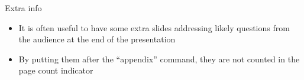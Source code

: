 \documentclass[
  xcolor={hyperref,svgnames,x11names,table},
  hyperref={pdfencoding=unicode,plainpages=false,pdfpagelabels=true,breaklinks=true},
  brazilian,english,12pt,aspectratio=149,
]{beamer}
\begin{document}
\showqrcode

\appendix

\begin{frame}{Extra info}
  \begin{itemize}
    \item It is often useful to have some extra slides addressing likely questions from the audience at the end of the presentation
    \item By putting them after the ``appendix'' command, they are not counted in the page count indicator
  \end{itemize}
\end{frame}
\end{document}
